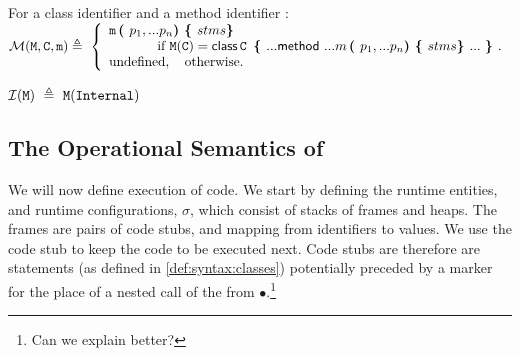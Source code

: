   
 \begin{definition}[Lookup] For a class identifier   and a method identifier  : $ ~ $ \\

\noindent
$
\Meths {} {\prg{C}} {m}       \triangleq  \ \left\{  
\begin{array}{l}
                        \m\, \lp p_1, ... p_n \rp \lb stms   \rb\\
\hspace{0.5in} \mbox{if}\  \M(\prg{C}) =   \kw{class}\, \prg{C}\, \  \lb ...   \kw{method}\ ...  m\, \lp p_1, ... p_n \rp \lb stms  \rb  ... \ \rb.  
\\
\mbox{undefined},  \ \ \ \mbox{otherwise.}
\end{array}
                    \right.$
 
${\mathcal{ I}} ( {{\mbox{\tt{\ensuremath{{\mbox{\tt{M}}}}}}}} ) \     \triangleq  \     {\mbox{\tt{\ensuremath{{\mbox{\tt{M}}}}}}}({\mbox{\tt{Internal}}} )$
  \end{definition}

\subsection{The Operational Semantics of \LangOO}
\label{formal:semantics}

We will now define execution of \LangOO code. We start by  defining the  runtime entities, and runtime configurations, $\sigma$, which consist of stacks of frames and heaps. The frames are pairs of code stubs, and mapping from identifiers to values. We use the code stub to keep the code to be executed next. Code stubs are therefore are statements (as defined in \ref{def:syntax:classes}) potentially preceded by a marker for the place of a nested call of the from \x {\kw{:=}} $\bullet$.\footnote{Can we explain better?} 


